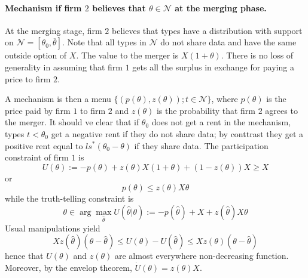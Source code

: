 \documentclass[a4paper]{article}
\newcommand{\N}{\mathcal N}
\renewcommand{\th}{\hat\theta}
\renewcommand{\t}{\theta}
\begin{document}
\paragraph{Mechanism if firm $2$ believes that $\t\in\N$ at the merging phase.} At the merging stage, firm $2$ believes that types have a distribution with support on $\N=[\t_0,\overline \t]$. Note that all types in $\N$ do not share data and have the same outside option of $X$. The value to the merger is $X(1+\t)$. There is no loss of generality in assuming that firm $1$ gets all the surplus in exchange for paying a price to firm $2$.

A mechanism is then a menu $\{(p(\t),z(\t));t\in \N\}$, where $p(\t)$ is the price paid by firm $1$ to firm $2$ and $z(\t)$ is the probability that firm $2$ agrees to the merger. It should ve clear that if $\t_0$ does not get a rent in the mechanism, types $t<\t_0$ get a negative rent if they do not share data; by conttrast they get a positive rent equal to $ls^* (\t_0-\t)$ if they share data. The participation constraint of firm $1$ is
\begin{equation}
  U(\t):=-p(\t)+z(\t)X(1+\t)+(1-z(\t))X\geq X 
\end{equation}
or
\begin{equation*}
  p(\t)\leq z(\t)X \t
\end{equation*}
while the truth-telling constraint is
\begin{equation*}
  \t \in \arg\max_{\th} U(\th|\t):=-p(\th)+X+ z(\th)X\t
\end{equation*}
%
Usual manipulations yield 
%
\[
  X z(\th)(\t-\th)\leq U(\t)-U(\th)\leq Xz(\t)(\t-\th)
\]
%
hence that $U(\t)$ and $z(\t)$ are almost everywhere non-decreasing function. Moreover, by the envelop theorem, $\dot U(\theta)=z(\t)X$. 
\end{document}
